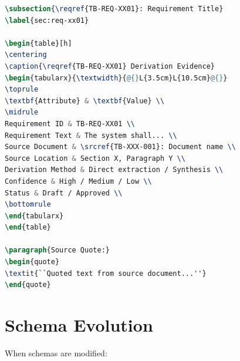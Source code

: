 \begin{lstlisting}[language=tex,basicstyle=\ttfamily\small]
\subsection{\reqref{TB-REQ-XX01}: Requirement Title}
\label{sec:req-xx01}

\begin{table}[h]
\centering
\caption{\reqref{TB-REQ-XX01} Derivation Evidence}
\begin{tabularx}{\textwidth}{@{}L{3.5cm}L{10.5cm}@{}}
\toprule
\textbf{Attribute} & \textbf{Value} \\
\midrule
Requirement ID & TB-REQ-XX01 \\
Requirement Text & The system shall... \\
Source Document & \srcref{TB-XXX-001}: Document name \\
Source Location & Section X, Paragraph Y \\
Derivation Method & Direct extraction / Synthesis \\
Confidence & High / Medium / Low \\
Status & Draft / Approved \\
\bottomrule
\end{tabularx}
\end{table}

\paragraph{Source Quote:}
\begin{quote}
\textit{``Quoted text from source document...''}
\end{quote}
\end{lstlisting}

\section{Schema Evolution}
\label{sec:schema-evolution}

When schemas are modified:

